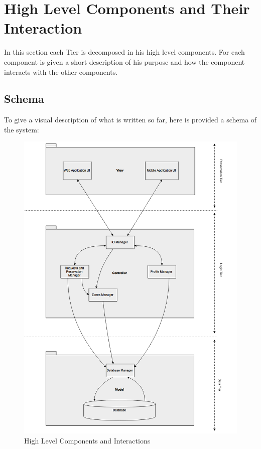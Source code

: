 \documentclass[../../../../dd.tex]{subfiles}
\begin{document}
	\section{High Level Components and Their Interaction}
		In this section each Tier is decomposed in his high level components. For each component is given a short description of his purpose and how the component interacts with the other components.
	
		

		

		

		\subsection{Schema}
			To give a visual description of what is written so far, here is provided a schema of the system:

			\begin{figure}[H]
				\centering
				\includegraphics[width=\textwidth, scale=0.5]{../images/HighLevelComponents}
			\caption{High Level Components and Interactions}\label{fig:HighLevelComponents}
		\end{figure}
	
\end{document}
